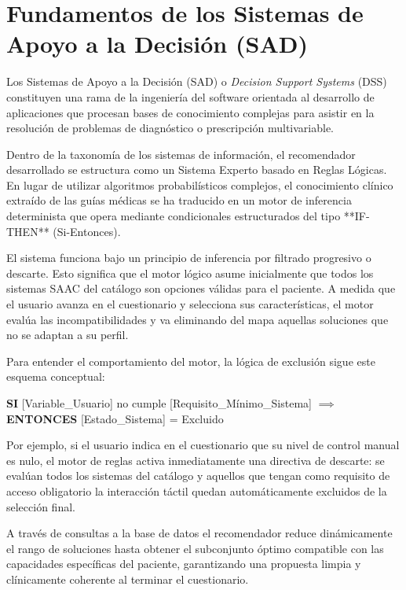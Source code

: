 \section{Fundamentos de los Sistemas de Apoyo a la Decisión (SAD)}
Los Sistemas de Apoyo a la Decisión (SAD) o \textit{Decision Support Systems} (DSS) constituyen una rama de la ingeniería del software orientada al desarrollo de aplicaciones que procesan bases de conocimiento complejas para asistir en la resolución de problemas de diagnóstico o prescripción multivariable. 

Dentro de la taxonomía de los sistemas de información, el recomendador desarrollado se estructura como un Sistema Experto basado en Reglas Lógicas. En lugar de utilizar algoritmos probabilísticos complejos, el conocimiento clínico extraído de las guías médicas se ha traducido en un motor de inferencia determinista que opera mediante condicionales estructurados del tipo **IF-THEN** (Si-Entonces).

El sistema funciona bajo un principio de inferencia por filtrado progresivo o descarte. Esto significa que el motor lógico asume inicialmente que todos los sistemas SAAC del catálogo son opciones válidas para el paciente. A medida que el usuario avanza en el cuestionario y selecciona sus características, el motor evalúa las incompatibilidades y va eliminando del mapa aquellas soluciones que no se adaptan a su perfil.

Para entender el comportamiento del motor, la lógica de exclusión sigue este esquema conceptual:

\begin{center}
\textbf{SI} [Variable\_Usuario] no cumple [Requisito\_Mínimo\_Sistema] $\implies$ \textbf{ENTONCES} [Estado\_Sistema] = Excluido
\end{center}

Por ejemplo, si el usuario indica en el cuestionario que su nivel de control manual es nulo, el motor de reglas activa inmediatamente una directiva de descarte: se evalúan todos los sistemas del catálogo y aquellos que tengan como requisito de acceso obligatorio la interacción táctil quedan automáticamente excluidos de la selección final. 

A través de consultas a la base de datos el recomendador reduce dinámicamente el rango de soluciones hasta obtener el subconjunto óptimo compatible con las capacidades específicas del paciente, garantizando una propuesta limpia y clínicamente coherente al terminar el cuestionario.

